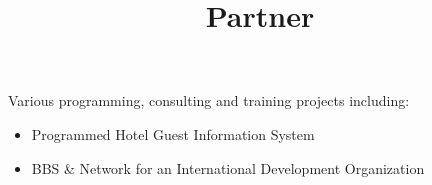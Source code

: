 \title{ Partner }
\begin{position}
Various programming, consulting and training projects
including:
 \begin{itemize}
 \item Programmed Hotel Guest Information System
 \item BBS \& Network for an International Development Organization
 \end{itemize}
\end{position}
